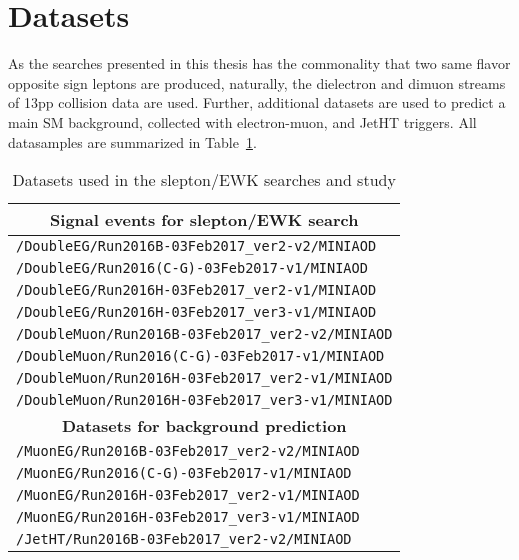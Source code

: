 \section{Datasets}
\label{sec:samplesObjects}
As the searches presented in this thesis has the commonality that two same flavor opposite sign leptons are produced, naturally, the dielectron and dimuon streams of 13\TeV pp collision data are used.
Further, additional datasets are used to predict a main SM background, collected with electron-muon, \ptmiss and JetHT triggers. 
All datasamples are summarized in Table~\ref{tab:datasets}.  
\begin{table}[ht!]
\def\arraystretch{1.2}
    \caption{Datasets used in the slepton/EWK searches and \ptmiss study}
    \label{tab:datasets}
    \begin{center}
        \begin{tabular}{ l}
        \hline\hline 
        \multicolumn{1}{c}{\textbf{Signal events for slepton/EWK search}} \\
        \hline
        \texttt{/DoubleEG/Run2016B-03Feb2017\_ver2-v2/MINIAOD}    \\
        \texttt{/DoubleEG/Run2016(C-G)-03Feb2017-v1/MINIAOD}     \\
        \texttt{/DoubleEG/Run2016H-03Feb2017\_ver2-v1/MINIAOD}    \\
        \texttt{/DoubleEG/Run2016H-03Feb2017\_ver3-v1/MINIAOD}    \\
        \texttt{/DoubleMuon/Run2016B-03Feb2017\_ver2-v2/MINIAOD}   \\
        \texttt{/DoubleMuon/Run2016(C-G)-03Feb2017-v1/MINIAOD}  \\
        \texttt{/DoubleMuon/Run2016H-03Feb2017\_ver2-v1/MINIAOD}    \\
        \texttt{/DoubleMuon/Run2016H-03Feb2017\_ver3-v1/MINIAOD}   \\
        \hline        
        \multicolumn{1}{c}{\textbf{Datasets for background prediction}} \\
        \hline
        \texttt{/MuonEG/Run2016B-03Feb2017\_ver2-v2/MINIAOD}    \\
        \texttt{/MuonEG/Run2016(C-G)-03Feb2017-v1/MINIAOD}    \\
        \texttt{/MuonEG/Run2016H-03Feb2017\_ver2-v1/MINIAOD}    \\
        \texttt{/MuonEG/Run2016H-03Feb2017\_ver3-v1/MINIAOD}    \\           
        \texttt{/JetHT/Run2016B-03Feb2017\_ver2-v2/MINIAOD}   \\

\end{tabular}
\end{center}
\end{table}
